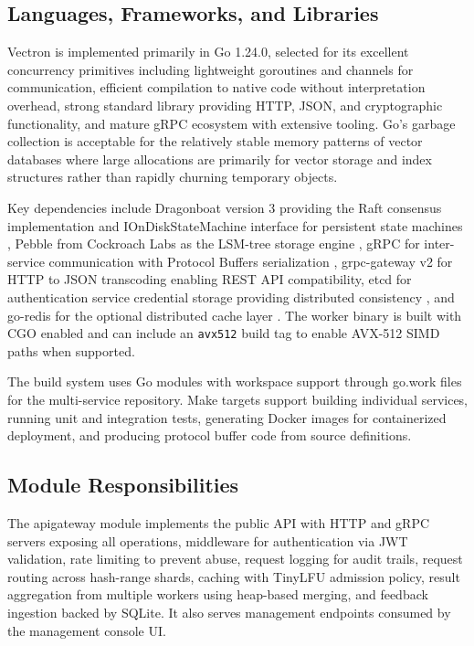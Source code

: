 \documentclass[conference]{IEEEtran}
\begin{document}
\subsection{Languages, Frameworks, and Libraries}

Vectron is implemented primarily in Go 1.24.0, selected for its excellent concurrency primitives including lightweight goroutines and channels for communication, efficient compilation to native code without interpretation overhead, strong standard library providing HTTP, JSON, and cryptographic functionality, and mature gRPC ecosystem with extensive tooling. Go's garbage collection is acceptable for the relatively stable memory patterns of vector databases where large allocations are primarily for vector storage and index structures rather than rapidly churning temporary objects.

Key dependencies include Dragonboat version 3 providing the Raft consensus implementation and IOnDiskStateMachine interface for persistent state machines \cite{dragonboat}, Pebble from Cockroach Labs as the LSM-tree storage engine \cite{pebble}, gRPC for inter-service communication with Protocol Buffers serialization \cite{grpc,protobuf}, grpc-gateway v2 for HTTP to JSON transcoding enabling REST API compatibility, etcd for authentication service credential storage providing distributed consistency \cite{etcd}, and go-redis for the optional distributed cache layer \cite{redis}. The worker binary is built with CGO enabled and can include an \texttt{avx512} build tag to enable AVX-512 SIMD paths when supported.

The build system uses Go modules with workspace support through go.work files for the multi-service repository. Make targets support building individual services, running unit and integration tests, generating Docker images for containerized deployment, and producing protocol buffer code from source definitions.

\subsection{Module Responsibilities}

The apigateway module implements the public API with HTTP and gRPC servers exposing all operations, middleware for authentication via JWT validation, rate limiting to prevent abuse, request logging for audit trails, request routing across hash-range shards, caching with TinyLFU admission policy, result aggregation from multiple workers using heap-based merging, and feedback ingestion backed by SQLite. It also serves management endpoints consumed by the management console UI.
\end{document}
